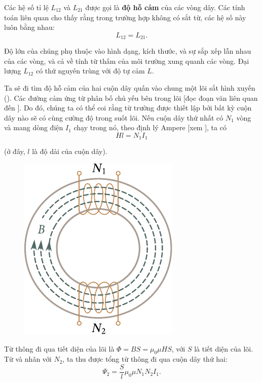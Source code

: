 Các hệ số tỉ lệ $L_{12}$ và $L_{21}$ được gọi là \textbf{độ hỗ cảm} của các vòng dây.
Các tính toán liên quan cho thấy rằng trong trường hợp không có sắt từ, các hệ số này luôn bằng nhau:
\begin{equation}\label{eq:8_30}
	L_{12} = L_{21}.
\end{equation}

\noindent
Độ lớn của chúng phụ thuộc vào hình dạng, kích thước,
và sự sắp xếp lẫn nhau của các vòng, và cả về tính từ thấm của môi trường xung quanh các vòng.
Đại lượng $L_{12}$ có thứ nguyên trùng với độ tự cảm $L$.

Ta sẽ đi tìm độ hỗ cảm của hai cuộn dây quấn vào chung một lõi sắt hình xuyến ().
Các đường cảm ứng từ phân bố chủ yếu bên trong lõi [đọc đoạn văn liên quan đến ].
Do đó, chúng ta có thể coi rằng từ trường được thiết lập bởi bất kỳ cuộn dây nào sẽ có cùng cường độ trong suốt lõi.
Nếu cuộn dây thứ nhất có $N_1$ vòng và mang dòng điện $I_1$ chạy trong nó, theo định lý Ampere [xem ], ta có
\begin{equation}\label{eq:8_31}
	Hl = N_1 I_1
\end{equation}

\noindent
(ở đây, $l$ là độ dài của cuộn dây).

\begin{figure}[!h]
	\begin{center}
		\includegraphics[scale=1]{figures/ch_08/fig_8_10.pdf}
		\caption[]{}
		\label{fig:8_10}
	\end{center}
	\vspace{-0.8cm}
\end{figure}

Từ thông đi qua tiết diện của lõi là $\Phi=BS=\mu_0\mu HS$, với $S$ là tiết diện của lõi.
 Từ  và nhân với $N_2$, ta thu được tổng từ thông đi qua cuộn dây thứ hai:
\begin{equation*}
	\Psi_2 = \frac{S}{l} \mu_0 \mu N_1 N_2 I_1.
\end{equation*}

